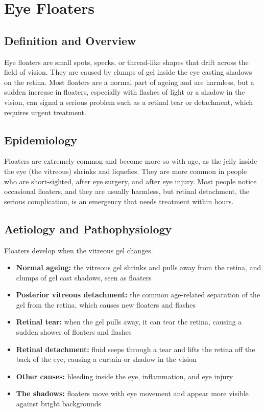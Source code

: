 \chapter{Eye Floaters}

\section*{Definition and Overview}
Eye floaters are small spots, specks, or thread-like shapes that drift across the field of vision. They are caused by clumps of gel inside the eye casting shadows on the retina. Most floaters are a normal part of ageing and are harmless, but a sudden increase in floaters, especially with flashes of light or a shadow in the vision, can signal a serious problem such as a retinal tear or detachment, which requires urgent treatment.

\section*{Epidemiology}
Floaters are extremely common and become more so with age, as the jelly inside the eye (the vitreous) shrinks and liquefies. They are more common in people who are short-sighted, after eye surgery, and after eye injury. Most people notice occasional floaters, and they are usually harmless, but retinal detachment, the serious complication, is an emergency that needs treatment within hours.

\section*{Aetiology and Pathophysiology}
Floaters develop when the vitreous gel changes.
\begin{itemize}
    \item \textbf{Normal ageing:} the vitreous gel shrinks and pulls away from the retina, and clumps of gel cast shadows, seen as floaters
    \item \textbf{Posterior vitreous detachment:} the common age-related separation of the gel from the retina, which causes new floaters and flashes
    \item \textbf{Retinal tear:} when the gel pulls away, it can tear the retina, causing a sudden shower of floaters and flashes
    \item \textbf{Retinal detachment:} fluid seeps through a tear and lifts the retina off the back of the eye, causing a curtain or shadow in the vision
    \item \textbf{Other causes:} bleeding inside the eye, inflammation, and eye injury
    \item \textbf{The shadows:} floaters move with eye movement and appear more visible against bright backgrounds
\end{itemize}

